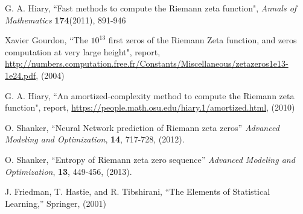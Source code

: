 \documentclass[twoside]{article}
\theoremstyle{definition}
\begin{document}
\begin{thebibliography} {}
 G. A. Hiary,
``Fast methods to compute the Riemann zeta function",
{\it Annals of Mathematics} {\bf174}(2011), 891-946

 Xavier Gourdon,
``The $10^{13}$ first zeros of the Riemann Zeta function,
and zeros computation at very large height", report,
\url{http://numbers.computation.free.fr/Constants/Miscellaneous/zetazeros1e13-1e24.pdf}, (2004)

 G. A. Hiary,
``An amortized-complexity method to compute the Riemann zeta function", report,
\url{https://people.math.osu.edu/hiary.1/amortized.html}, (2010)

 O. Shanker, ``Neural Network prediction of Riemann zeta zeros''
{\it Advanced Modeling and Optimization}, {\bf 14}, 717-728, (2012). 

 O. Shanker, ``Entropy of Riemann zeta zero sequence''
{\it Advanced Modeling and Optimization}, {\bf 13}, 449-456, (2013). 

 J. Friedman, T. Hastie, and R. Tibshirani, ``The Elements of Statistical Learning,''
Springer,  (2001) 

\end{thebibliography} 
\end{document}

